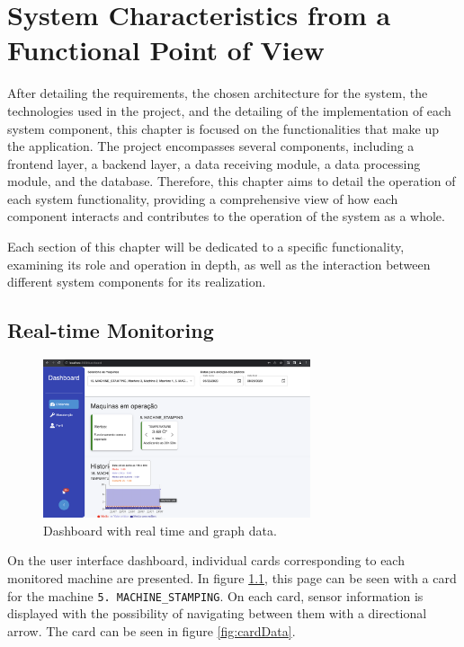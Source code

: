 \chapter{System Characteristics from a Functional Point of View}\label{cap:functions}

After detailing the requirements, the chosen architecture for the system, the technologies used in the project, and the detailing of the implementation of each system component, this chapter is focused on the functionalities that make up the application. The project encompasses several components, including a frontend layer, a backend layer, a data receiving module, a data processing module, and the database. Therefore, this chapter aims to detail the operation of each system functionality, providing a comprehensive view of how each component interacts and contributes to the operation of the system as a whole.

Each section of this chapter will be dedicated to a specific functionality, examining its role and operation in depth, as well as the interaction between different system components for its realization.


\section[Real-time Monitoring]{Real-time Monitoring}\label{sec:realtimeMonitoring}

\begin{figure}[htbp]
	\centering
	\includegraphics[width=0.7\textwidth]{images/dashboard.png}
	\caption{Dashboard with real time and graph data.}
	\label{fig:dashboradPage}
\end{figure}

On the user interface dashboard, individual cards corresponding to each monitored machine are presented. In figure \ref{fig:dashboradPage}, this page can be seen with a card for the machine \texttt{5. MACHINE\_STAMPING}. On each card, sensor information is displayed with the possibility of navigating between them with a directional arrow. The card can be seen in figure \ref{fig:cardData}.

